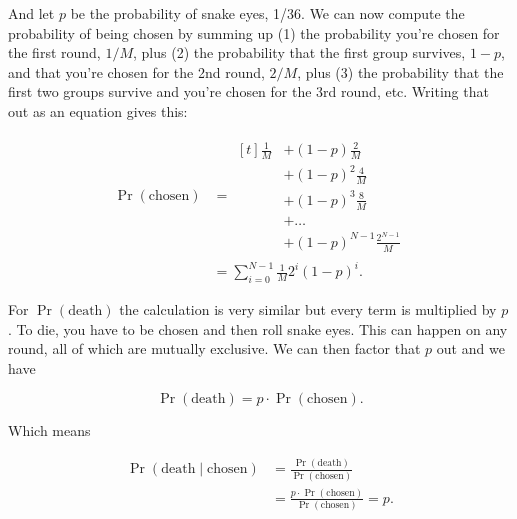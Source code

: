 \documentclass[article,twocolumn]{memoir}
\begin{document}
And let $p$ be the probability of snake eyes, 1/36.
We can now compute the probability of being chosen by summing up 
(1) the probability you're chosen for the first round, $1/M$, plus 
(2) the probability that the first group survives, $1-p$, and that you're chosen for the 2nd round, $2/M$, plus 
(3) the probability that the first two groups survive and you're chosen for the 3rd round, etc.
Writing that out as an equation gives this:

\begin{align*}
\Pr(\text{chosen}) & = 
\begin{aligned}[t]
\tfrac{1}{M} & + (1-p)\tfrac{2}{M} \\
& + (1-p)^2\tfrac{4}{M} \\
& + (1-p)^3\tfrac{8}{M} \\
& + \ldots \\
& + (1-p)^{N-1}\frac{2^{N-1}}{M}
\end{aligned} \\
& = \sum_{i=0}^{N-1} \tfrac{1}{M} 2^i(1-p)^i.
\end{align*}

For $\Pr(\text{death})$ the calculation is very similar but every term is multiplied by $p$.
To die, you have to be chosen and then roll snake eyes.
This can happen on any round, all of which are mutually exclusive.
We can then factor that $p$ out and we have

$$
\Pr(\text{death}) = p\cdot\Pr(\text{chosen}).
$$

Which means

\begin{equation*}
\begin{split}
\Pr(\text{death} \mid \text{chosen}) & = 
\frac{\Pr(\text{death})}{\Pr(\text{chosen})} \\
& = \frac{p\cdot\Pr(\text{chosen})}{\Pr(\text{chosen})} = 
p.
\end{split}
\end{equation*}
\end{document}
